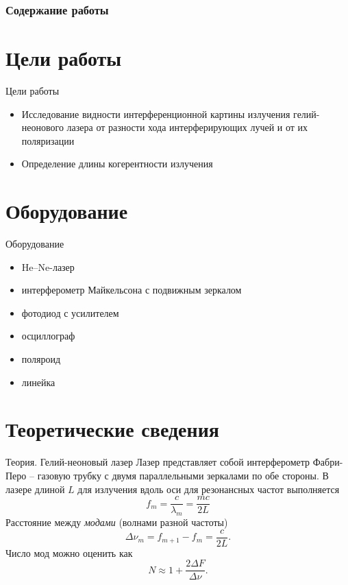 \documentclass[11pt]{beamer} %
\begin{document}
\frame{\titlepage}

\begin{frame}
    \frametitle{Содержание работы}
    \tableofcontents
\end{frame}

\section{Цели работы}
    \begin{frame}{Цели работы}
        \begin{itemize}
            \item Исследование видности интерференционной картины излучения гелий-неонового лазера от разности хода интерферирующих лучей и от их поляризации
            \item Определение длины когерентности излучения
        \end{itemize}
    \end{frame}

    \section{Оборудование}
    \begin{frame}{Оборудование}
        \begin{itemize}
            \item He--Ne-лазер
            \item интерферометр Майкельсона с подвижным зеркалом
            \item фотодиод с усилителем
            \item осциллограф
            \item поляроид
            \item линейка
        \end{itemize}
    \end{frame}

    \section{Теоретические сведения}

    \begin{frame}{Теория. Гелий-неоновый лазер}
        Лазер представляет собой интерферометр Фабри-Перо -- газовую трубку с двумя параллельными зеркалами по обе стороны. В лазере длиной $L$ для излучения вдоль оси для резонансных частот выполняется 
        \begin{equation}
            f_m = \frac{c}{\lambda_m} = \frac{mc}{2L}
        \end{equation}
        Расстояние между \textit{модами} (волнами разной частоты) 
        \begin{equation}
        \Delta \nu_m = f_{m+1} - f_m = \dfrac{c}{2L}.
        \end{equation}
        Число мод можно оценить как 
        \begin{equation}
        N \approx 1 + \dfrac{2\Delta F}{\Delta \nu}.
        \end{equation}
    \end{frame}
\end{document}
